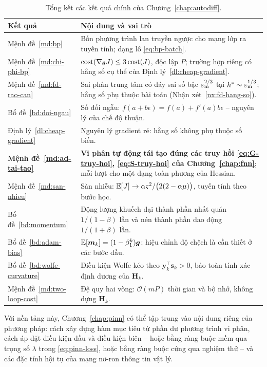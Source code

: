 \begin{table}[htbp]
\centering
\caption{Tổng kết các kết quả chính của Chương~\ref{chap:autodiff}.}
\label{tab:tong-ket-3}
\small
\begin{tabular}{@{}l p{8.2cm}@{}}
\toprule
\textbf{Kết quả} & \textbf{Nội dung và vai trò} \\
\midrule
Mệnh đề~\ref{md:bp}
  & Bốn phương trình lan truyền ngược cho mạng lớp ra tuyến tính; dạng lô
    \eqref{eq:bp-batch}. \\
Mệnh đề~\ref{md:chi-phi-bp}
  & $\mathrm{cost}(\nabla_{\bm{\theta}}J) \le 3\,\mathrm{cost}(J)$, độc lập $P$;
    trường hợp riêng có hằng số cụ thể của Định lý~\ref{dl:cheap-gradient}. \\
Mệnh đề~\ref{md:fd-rao-can}
  & Sai phân trung tâm có đáy sai số bậc $\varepsilon_{\mathrm{m}}^{2/3}$ tại
    $h^{*}\sim\varepsilon_{\mathrm{m}}^{1/3}$; hằng số phụ thuộc bài toán
    (Nhận xét~\ref{nx:fd-hang-so}). \\
Bổ đề~\ref{bd:doi-ngau}
  & Số đối ngẫu: $f(a+b\epsilon) = f(a)+f'(a)b\epsilon$ -- nguyên lý của chế độ
    thuận. \\
Định lý~\ref{dl:cheap-gradient}
  & Nguyên lý gradient rẻ: hằng số không phụ thuộc số biến. \\
\textbf{Mệnh đề~\ref{md:ad-tai-tao}}
  & \textbf{Vi phân tự động tái tạo đúng các truy hồi
    \eqref{eq:G-truy-hoi}, \eqref{eq:S-truy-hoi} của Chương~\ref{chap:fnn}};
    mỗi lượt cho một dạng toàn phương của Hessian. \\
Mệnh đề~\ref{md:san-nhieu}
  & Sàn nhiễu: $\mathbb{E}[J] \to \alpha\varsigma^2/\big(2(2-\alpha\mu)\big)$, tuyến
    tính theo bước học. \\
Bổ đề~\ref{bd:momentum}
  & Động lượng khuếch đại thành phần nhất quán $1/(1-\beta)$ lần và nén thành
    phần dao động $1/(1+\beta)$ lần. \\
Bổ đề~\ref{bd:adam-bias}
  & $\mathbb{E}[\bm{m}_k] = (1-\beta_1^k)\bm{g}$: hiệu chỉnh độ chệch là cần thiết ở
    các bước đầu. \\
Bổ đề~\ref{bd:wolfe-curvature}
  & Điều kiện Wolfe kéo theo $\bm{y}_k^{\top}\bm{s}_k > 0$, bảo toàn tính xác
    định dương của $\bm{H}_k$. \\
Mệnh đề~\ref{md:two-loop-cost}
  & Đệ quy hai vòng: $\mathcal{O}(mP)$ thời gian và bộ nhớ, không dựng
    $\bm{H}_k$. \\
\bottomrule
\end{tabular}
\end{table}
 
Với nền tảng này, Chương~\ref{chap:pinn} có thể tập trung vào nội dung riêng của
phương pháp: cách xây dựng hàm mục tiêu từ phần dư phương trình vi phân, cách áp
đặt điều kiện đầu và điều kiện biên -- hoặc bằng ràng buộc mềm qua trọng số
$\lambda$ trong \eqref{eq:pinn-loss}, hoặc bằng ràng buộc cứng qua nghiệm thử --
và các đặc tính hội tụ của mạng nơ-ron thông tin vật lý.
 